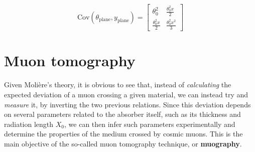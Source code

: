 \documentclass[a4paper, 11pt, twoside, openright]{report}
\begin{document}
\begin{equation}
\text{Cov}(\theta_\text{plane}, y_\text{plane}) = \begin{bmatrix}
\theta^2_0 & \frac{\theta_0^2x}{2} \\
\frac{\theta_0^2x}{2} & \frac{\theta_0^2x^2}{3} 
\end{bmatrix}
\end{equation}




\section{Muon tomography} \label{sec:tomography}

Given Moli\`ere's theory, it is obvious to see that, instead of \textit{calculating} the expected deviation of a muon crossing a given material, we can instead try and \textit{measure} it, by inverting the two previous relations. Since this deviation depends on several parameters related to the absorber itself, such as its thickness and radiation length $X_0$, we can then infer such parameters experimentally and determine the properties of the medium crossed by cosmic muons. This is the main objective of the so-called muon tomography technique, or \textbf{muography}. 
\end{document}
